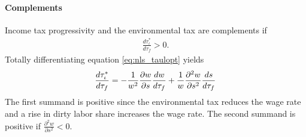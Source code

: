 \paragraph{Complements}
Income tax progressivity and the environmental tax
are complements if 
\begin{align}
\frac{d \tau_{\iota}^*}{d \tau_{f}}>0.
\end{align}
Totally differentiating equation \ref{eq:nls_taulopt} yields
\begin{align}
\frac{d \tau_{\iota}^*}{d \tau_f}=-\frac{1}{w^2}\frac{\partial{w}}{\partial{s}}\frac{dw}{d \tau_f}+\frac{1}{w}\frac{\partial^2 w}{\partial s^2}\frac{ds}{d \tau_f}
\end{align}
The first summand is positive since the environmental tax reduces the wage rate and a rise in dirty labor share increases the wage rate. The second summand is positive if $\frac{\partial^2 w}{\partial s^2}<0$. 



 
 
